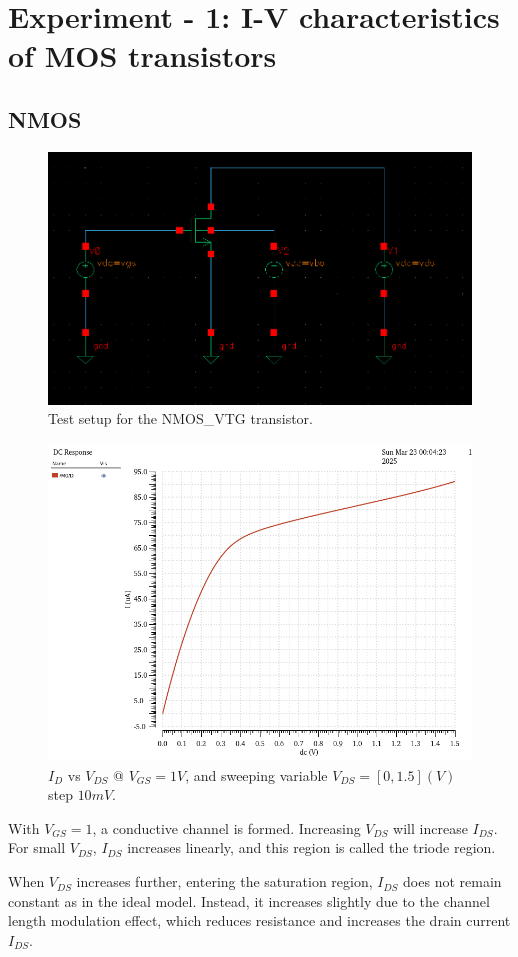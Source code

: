 \newpage
\section{Experiment - 1: I-V characteristics of MOS transistors}
\subsection{NMOS}
\begin{figure}[H]
	\centering
	\includegraphics[width = 0.6\linewidth]{sections/pic/EX1_NMOS.png}
	\caption{Test setup for the NMOS\_VTG transistor.}
	\label{f_ex1NMOS-schematic}
\end{figure}


\begin{figure}[H]
	\centering
	\includegraphics[width=0.6\linewidth]{sections/pic/EX1_NMOS_Id&Vds(Vgs1).png}
	\caption{$I_D$ vs $V_{DS}$ @ $V_{GS} = 1V$, and sweeping variable $V_{DS} = [0, 1.5](V)$ step $10mV$.}
	\label{f_EX1_NMOS_Id&Vds(Vgs1)}
\end{figure}

\begin{discussion}
	\item With \( V_{GS} = 1 \), a conductive channel is formed. Increasing \( V_{DS} \) will increase \( I_{DS} \). For small \( V_{DS} \), \( I_{DS} \) increases linearly, and this region is called the triode region.
	\item When \( V_{DS} \) increases further, entering the saturation region, \( I_{DS} \) does not remain constant as in the ideal model. Instead, it increases slightly due to the channel length modulation effect, which reduces resistance and increases the drain current \( I_{DS} \).
\end{discussion}

